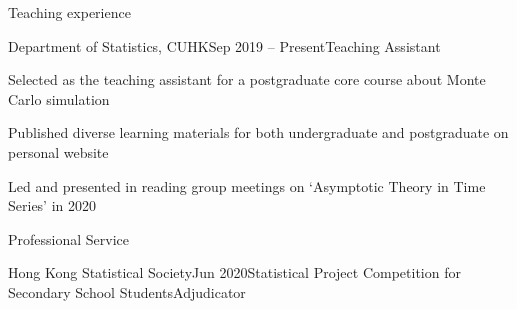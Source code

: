 \documentclass[10pt]{resume} %
\begin{document}

\begin{rSection}{Teaching experience}

\begin{rSubsection}{Department of Statistics, CUHK}{Sep 2019 -- Present}{Teaching Assistant}{}
\item Selected as the teaching assistant for a postgraduate core course about Monte Carlo simulation
\item Published diverse learning materials for both undergraduate and postgraduate on personal website
\item Led and presented in reading group meetings on `Asymptotic Theory in Time Series' in 2020
\end{rSubsection}

\end{rSection}


\begin{rSection}{Professional Service}

\begin{rSubsection}{Hong Kong Statistical Society}{Jun 2020}{Statistical Project Competition for Secondary School Students}{Adjudicator}
\end{rSubsection}

\end{rSection}

\end{document}
